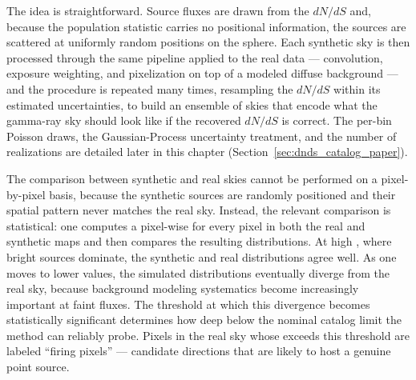 The idea is straightforward.
Source fluxes are drawn from the $dN/dS$ and, because the population statistic carries no positional information, the sources are scattered at uniformly random positions on the sphere. Each synthetic sky is then processed through the same pipeline applied to the real data --- \PSF convolution, exposure weighting, and pixelization on top of a modeled diffuse background --- and the procedure is repeated many times, resampling the $dN/dS$ within its estimated uncertainties, to build an ensemble of skies that encode what the gamma-ray sky should look like if the recovered $dN/dS$ is correct. The per-bin Poisson draws, the Gaussian-Process uncertainty treatment, and the number of realizations are detailed later in this chapter (Section~\ref{sec:dnds_catalog_paper}).

The comparison between synthetic and real skies cannot be performed on a pixel-by-pixel basis, because the synthetic sources are randomly positioned and their spatial pattern never matches the real sky.
Instead, the relevant comparison is statistical: one computes a pixel-wise \TS for every pixel in both the real and synthetic maps and then compares the resulting \TS distributions.
At high \TS, where bright sources dominate, the synthetic and real distributions agree well.
As one moves to lower \TS values, the simulated distributions eventually diverge from the real sky, because background modeling systematics become increasingly important at faint fluxes.
The threshold at which this divergence becomes statistically significant determines how deep below the nominal catalog limit the method can reliably probe.
Pixels in the real sky whose \TS exceeds this threshold are labeled ``firing pixels'' --- candidate directions that are likely to host a genuine point source.

